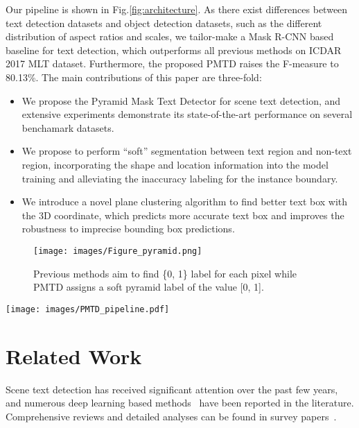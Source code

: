 \documentclass[10pt,twocolumn,letterpaper]{article}
\begin{document}
Our pipeline is shown in Fig.\ref{fig:architecture}. As there exist differences between text detection datasets and object detection datasets, such as the different distribution of aspect ratios and scales, we tailor-make a Mask R-CNN based baseline for text detection, which outperforms all previous methods on ICDAR 2017 MLT dataset. Furthermore, the proposed PMTD raises the F-measure to 80.13\%. The main contributions of this paper are three-fold:

\begin{itemize}
    \item We propose the Pyramid Mask Text Detector for scene text detection, and extensive experiments demonstrate its state-of-the-art performance on several benchamark datasets.
    \item We propose to perform ``soft'' segmentation between text region and non-text region, incorporating the shape and location information into the model training and alleviating the inaccuracy labeling for the instance boundary.
    \item We introduce a novel plane clustering algorithm to find better text box with the 3D coordinate, which predicts more accurate text box and improves the robustness to imprecise bounding box predictions.
\end{itemize}
\begin{figure}
    \texttt{[image: images/Figure\_pyramid.png]}
    \vspace{5pt}
    \caption{Previous methods aim to find \{0, 1\} label for each pixel while PMTD assigns a soft pyramid label of the value  [0, 1].}
    \label{fig:pyramid-mask}
\end{figure}

\begin{figure*}
    \texttt{[image: images/PMTD\_pipeline.pdf]}
    \vspace{0pt}
    \caption{Overall architecture of PMTD.}
    \label{fig:architecture}
\end{figure*}
     \section{Related Work}\label{sec:related-work}
    Scene text detection has received significant attention over the past few years, and numerous deep learning based methods~\cite{gupta2016synthetic,zhang2018feature,liao2018textboxes++,ma2018arbitrary,zhou2017east,he2017deep,li2018shape,long2018textsnake,xie2018scene} have been reported in the literature. Comprehensive reviews and detailed analyses can be found in survey papers~\cite{zhu2016scene,uchida2014text,ye2015text}. 
\end{document}
